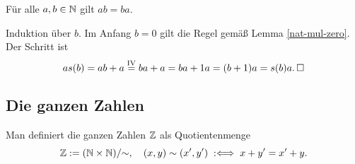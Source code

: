 \begin{Korollar}\newlinefirst
Für alle $a,b\in\mathbb N$ gilt $ab=ba$.
\end{Korollar}
\begin{Beweis}
Induktion über $b$. Im Anfang $b=0$ gilt die Regel gemäß
Lemma \ref{nat-mul-zero}. Der Schritt ist
\[as(b) = ab+a \stackrel{\mathrm{IV}}= ba+a = ba + 1a = (b+1)a = s(b)a.\,\square\]
\end{Beweis}

\subsection{Die ganzen Zahlen}

\begin{Definition}\newlinefirst
Man definiert die ganzen Zahlen $\mathbb Z$ als Quotientenmenge
\[\mathbb Z := (\mathbb N\times\mathbb N)/{\sim},\quad (x,y)\sim (x',y')\;:\Longleftrightarrow\; x+y' = x'+y.\]
\end{Definition}

